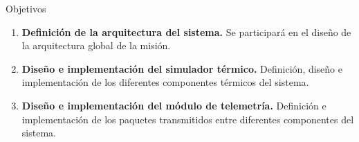 \begin{frame}{Objetivos}

\begin{enumerate}[<+->]
\item \textbf{Definición de la arquitectura del sistema.} Se participará en el diseño de la arquitectura global de la misión.
\item \textbf{Diseño e implementación del simulador térmico.} Definición, diseño e implementación de los diferentes componentes térmicos del sistema.
\item \textbf{Diseño e implementación del módulo de telemetría.} Definición e implementación de los paquetes transmitidos entre diferentes componentes del sistema.
\end{enumerate}

\end{frame}